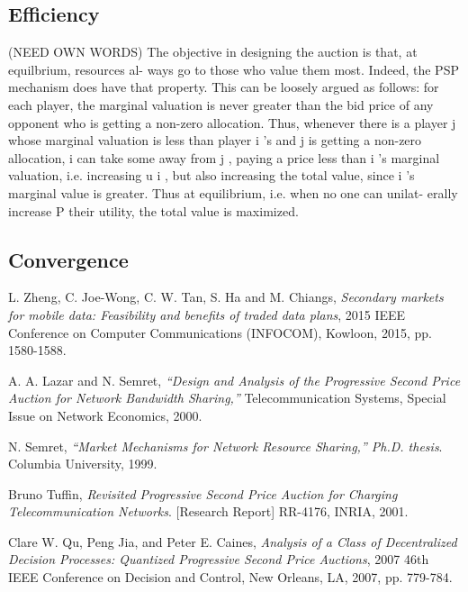 \documentclass[12pt]{article}
\theoremstyle{definition}
\begin{document}
\begin{multicols}{2}
\subsection{Efficiency}
(NEED OWN WORDS)
The objective in designing the auction is that, at equilbrium, resources al-
ways go to those who value them most. Indeed, the PSP mechanism does
have that property. This can be loosely argued as follows: for each player,
the marginal valuation is never greater than the bid price of any opponent
who is getting a non-zero allocation. Thus, whenever there is a player j
whose marginal valuation is less than player i 's and j is getting a non-zero
allocation, i can take some away from j , paying a price less than i 's marginal
valuation, i.e. increasing u i , but also increasing the total value, since i 's
marginal value is greater. Thus at equilibrium, i.e. when no one can unilat-
erally increase P their utility, the total value is maximized.

\subsection{Convergence}

\end{multicols}

\begin{thebibliography}{9}

L. Zheng, C. Joe-Wong, C. W. Tan, S. Ha and M. Chiangs, 
\textit{Secondary markets for mobile data: Feasibility and benefits of traded
data plans}, 2015 IEEE
Conference on Computer Communications (INFOCOM), Kowloon, 2015, pp. 1580-1588.

A. A. Lazar and N. Semret, 
\textit{“Design and Analysis of the Progressive Second Price Auction for Network
Bandwidth Sharing,”} Telecommunication Systems, Special Issue on Network Economics, 2000.

N. Semret, 
\textit{“Market Mechanisms for Network Resource Sharing,”
Ph.D. thesis}. 
Columbia University, 1999.

Bruno Tuffin,
\textit{Revisited Progressive Second Price Auction for Charging
Telecommunication Networks}.
[Research Report] RR-4176, INRIA, 2001.

Clare W. Qu, Peng Jia, and Peter E. Caines,
\textit{Analysis of a Class of Decentralized Decision Processes: Quantized
Progressive Second Price Auctions},
2007 46th IEEE Conference on Decision and Control, New Orleans, LA, 2007, pp.
779-784.

 
\end{thebibliography}
\end{document}
